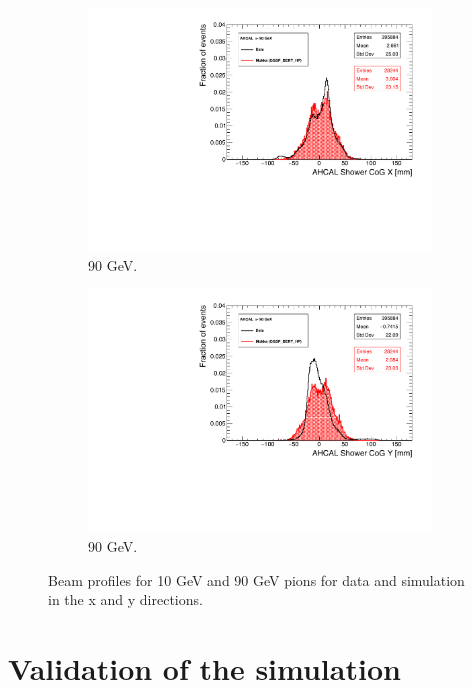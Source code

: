 \begin{figure}[htbp!]
\begin{subfigure}[t]{0.49\textwidth}
    \includegraphics[width=1.\linewidth]{chap5/fig_AHCAL_Timing/Pions/Run24332_CoGX_AHCAL_90GeV_Comparison.pdf}
    \caption{90 GeV.} \label{fig:pi90GeVX}
  \end{subfigure}
  \hfill
  \begin{subfigure}[t]{0.49\textwidth}
    \includegraphics[width=1.\linewidth]{chap5/fig_AHCAL_Timing/Pions/Run24332_CoGY_AHCAL_90GeV_Comparison.pdf}
    \caption{90 GeV.} \label{fig:pi90GeVY}
  \end{subfigure}
  \caption{Beam profiles for 10 GeV and 90 GeV pions for data and simulation in the x and y directions.}
  \label{fig:BPpi}
\end{figure}

\section{Validation of the simulation}

